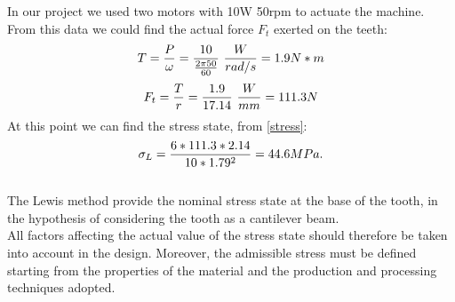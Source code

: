 In our project we used two motors with 10W 50rpm to actuate the machine. From this data we could find the actual force $F_t$ exerted on the teeth:
\begin{equation*}
	\centering
		T = \frac{P}{\omega} = \frac{10}{\frac{2\pi50}{60}} \ \frac{W}{rad/s} = 1.9 N*m 
\end{equation*}
\begin{equation*}
	\centering
	F_t = \frac{T}{r} = \frac{1.9}{17.14} \ \frac{W}{mm} = 111.3 N
\end{equation*}
At this point we can find the stress state, from \eqref{stress}:
\begin{equation}
	\centering
	\sigma_L=\frac{6*111.3*2.14}{10*1.79^2} = 44.6 MPa.
	\label{stressdata}
\end{equation}\\
The Lewis method provide the nominal stress state at the base of the tooth, in the hypothesis of considering the tooth as a cantilever beam.\\
All factors affecting the actual value of the stress state should therefore be taken into account in the design. Moreover, the admissible stress must be defined starting from the properties of the material and the production and processing techniques adopted.\\
